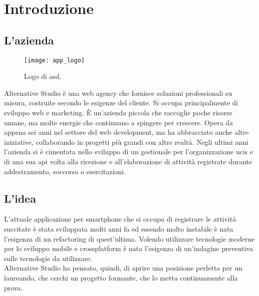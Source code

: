 
\chapter{Introduzione}
\label{cap:introduzione}

\section{L'azienda}

\begin{figure}[htbp]
	\begin{center}
		\texttt{[image: app\_logo]}
	\end{center}
	\caption {Logo di \acrlong{asd}.}
\end{figure}

Alternative Studio è una web agency che fornisce soluzioni professionali su misura, costruite secondo le esigenze del cliente. Si occupa
principalmente di sviluppo web e marketing. È un'azienda piccola che raccoglie poche risorse umane, ma molte energie che continuano a
spingere per crescere. Opera da appena sei anni nel settore del web development, ma ha abbracciato anche altre iniziative, collaborando in
progetti più grandi con altre realtà. Negli ultimi anni l'azienda si è cimentata nello sviluppo di un gestionale per l'organizzazione
\gls{ucis} e di una sua \acrshort{api} volta alla ricezione e all'elaborazione di attività registrate durante addestramento,
soccorso o esercitazioni.

\section{L'idea}

L'attuale applicazione per smartphone che si occupa di registrare le attività succitate è stata sviluppata molti anni fa ed essendo molto
instabile è nata l'esigenza di un refactoring di quest'ultima. Volendo utilizzare tecnologie moderne per lo sviluppo mobile e crossplatform
è nata l'esigenza di un'indagine preventiva sulle tecnologie da utilizzare. \\
Alternative Studio ha pensato, quindi, di aprire una posizione perfetta per un laureando, che cerchi un progetto formante, che lo metta continuamente alla prova.

